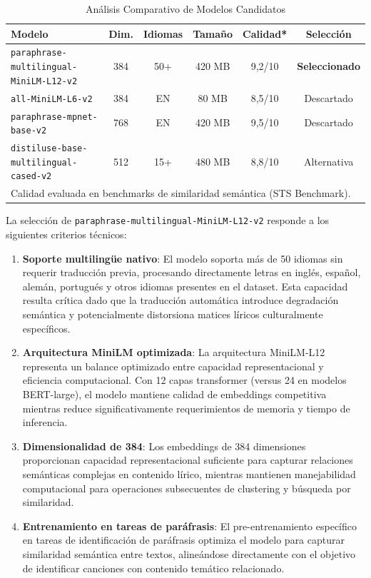 \begin{table}[htbp]
\centering
\caption{Análisis Comparativo de Modelos Candidatos}
\label{tab:modelos-candidatos}
\begin{tabular}{lccccc}
\toprule
\textbf{Modelo} & \textbf{Dim.} & \textbf{Idiomas} & \textbf{Tamaño} & \textbf{Calidad*} & \textbf{Selección} \\
\midrule
\texttt{paraphrase-multilingual-MiniLM-L12-v2} & 384 & 50+ & 420 MB & 9,2/10 & \textbf{Seleccionado} \\
\texttt{all-MiniLM-L6-v2} & 384 & EN & 80 MB & 8,5/10 & Descartado \\
\texttt{paraphrase-mpnet-base-v2} & 768 & EN & 420 MB & 9,5/10 & Descartado \\
\texttt{distiluse-base-multilingual-cased-v2} & 512 & 15+ & 480 MB & 8,8/10 & Alternativa \\
\bottomrule
\multicolumn{6}{l}{\footnotesize *Calidad evaluada en benchmarks de similaridad semántica (STS Benchmark).}
\end{tabular}
\end{table}

La selección de \texttt{paraphrase-multilingual-MiniLM-L12-v2} responde a los siguientes criterios técnicos:

\begin{enumerate}
    \item \textbf{Soporte multilingüe nativo}: El modelo soporta más de 50 idiomas sin requerir traducción previa, procesando directamente letras en inglés, español, alemán, portugués y otros idiomas presentes en el dataset. Esta capacidad resulta crítica dado que la traducción automática introduce degradación semántica y potencialmente distorsiona matices líricos culturalmente específicos.

    \item \textbf{Arquitectura MiniLM optimizada}: La arquitectura MiniLM-L12 representa un balance optimizado entre capacidad representacional y eficiencia computacional. Con 12 capas transformer (versus 24 en modelos BERT-large), el modelo mantiene calidad de embeddings competitiva mientras reduce significativamente requerimientos de memoria y tiempo de inferencia.

    \item \textbf{Dimensionalidad de 384}: Los embeddings de 384 dimensiones proporcionan capacidad representacional suficiente para capturar relaciones semánticas complejas en contenido lírico, mientras mantienen manejabilidad computacional para operaciones subsecuentes de clustering y búsqueda por similaridad.

    \item \textbf{Entrenamiento en tareas de paráfrasis}: El pre-entrenamiento específico en tareas de identificación de paráfrasis optimiza el modelo para capturar similaridad semántica entre textos, alineándose directamente con el objetivo de identificar canciones con contenido temático relacionado.
\end{enumerate}

